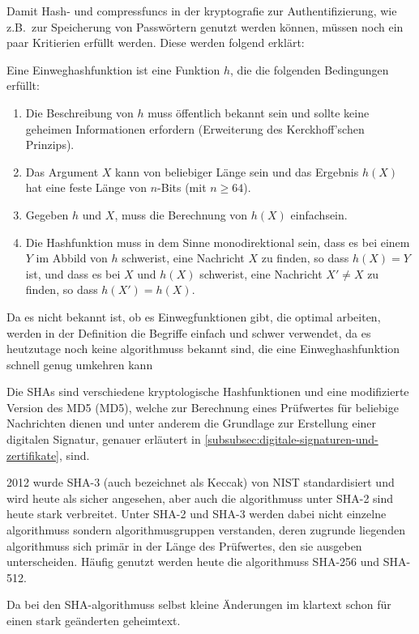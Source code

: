 Damit Hash- und \glspl{compressfunc} in der \gls{kryptografie} zur Authentifizierung, wie z.B.\ zur Speicherung von Passwörtern genutzt werden können, müssen noch ein paar Kritierien erfüllt werden.
Diese werden folgend erklärt:

\begin{definition}
    Eine Einweghashfunktion ist eine Funktion $h$, die die folgenden Bedingungen erfüllt\autocite[\pagef~17]{anal_des_hash_function_2003}:
    \begin{enumerate}
        \item Die Beschreibung von $h$ muss öffentlich bekannt sein und sollte keine geheimen Informationen erfordern (Erweiterung des Kerckhoff'schen Prinzips\autocite[]{petitcolas_information_nodate}).
        \item Das Argument $X$ kann von beliebiger Länge sein und das Ergebnis $h(X)$ hat eine feste Länge von $n$-Bits (mit $n \geq64$).
        \item Gegeben $h$ und $X$, muss die Berechnung von $h(X)$ einfach\footnotemark sein.
        \item Die Hashfunktion muss in dem Sinne monodirektional sein, dass es bei einem $Y$ im Abbild von $h$ schwer\footnotemark[\value{footnote}] ist, eine Nachricht $X$ zu finden, so dass $h(X)=Y$ ist, und dass es bei $X$ und $h(X)$ schwer\footnotemark[\value{footnote}] ist, eine Nachricht $X'\neq X$ zu finden, so dass $h(X') = h(X)$.
    \end{enumerate}
\end{definition}

Da es nicht bekannt ist, ob es Einwegfunktionen gibt, die optimal arbeiten, werden in der Definition die Begriffe einfach und schwer verwendet, da es heutzutage noch keine \glspl{algorithmus} bekannt sind, die eine Einweghashfunktion schnell genug umkehren kann\autocite[\pagef~234]{buchmann_einfuhrung_2016}

Die \acfp{SHA} sind verschiedene kryptologische Hashfunktionen und eine modifizierte Version des \gls{MD5} (\acs{MD5}), welche zur Berechnung eines Prüfwertes für beliebige Nachrichten dienen und unter anderem die Grundlage zur Erstellung einer digitalen Signatur, genauer erläutert in \autoref{subsubsec:digitale-signaturen-und-zertifikate}, sind\autocite[]{WhatisSH81:online}.

2012 wurde \ac{SHA}-3 (auch bezeichnet als Keccak) von \ac{NIST} standardisiert und wird heute als sicher angesehen\autocite[\pagef~239]{buchmann_einfuhrung_2016}, aber auch die \glspl{algorithmus} unter \ac{SHA}-2 sind heute stark verbreitet.
Unter \ac{SHA}-2 und \ac{SHA}-3 werden dabei nicht einzelne \glspl{algorithmus} sondern \gls{algorithmus}gruppen verstanden, deren zugrunde liegenden \glspl{algorithmus} sich primär in der Länge des Prüfwertes, den sie ausgeben unterscheiden.
Häufig genutzt werden heute die \glspl{algorithmus} \ac{SHA}-256 und \ac{SHA}-512.

Da bei den \ac{SHA}-\glspl{algorithmus} selbst kleine Änderungen im \gls{klartext} schon für einen stark geänderten \gls{geheimtext}.
